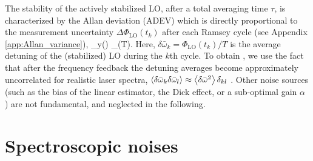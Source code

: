 The stability of the actively stabilized LO, after a total averaging time
$\tau$, is characterized by the Allan deviation (ADEV) which is directly
proportional to the measurement uncertainty $\Delta\Phi_\mathrm{LO}(t_k)$ after
each Ramsey cycle (see Appendix \ref{app:Allan_variance}),
\bel
	\label{eq:Allan-variance}
	\sigma_y(\tau) \equiv {}
	\approx
	  \Delta\Phi_(T).
\eel
Here, $\delta\bar\omega_k = \Phi_\mathrm{LO}(t_k)/T$ is the average detuning of the
(stabilized) LO during the $k$th cycle. {%
 To obtain , we use the fact that after the frequency
 feedback the detuning averages become approximately uncorrelated for realistic
 laser spectra, $\left< \delta\bar\omega_k \delta\bar\omega_l \right> \approx
 \left< \delta\bar\omega^2 \right>\delta_{kl}$ \cite{Borregaard2013,
 Andre2005,Bloom2013}}.
Other noise sources (such as the bias of the linear estimator, the Dick effect,
or a sub-optimal gain $\alpha$ \cite{Santarelli1998}) are not fundamental, and
neglected in the following.


\section{Spectroscopic noises}

